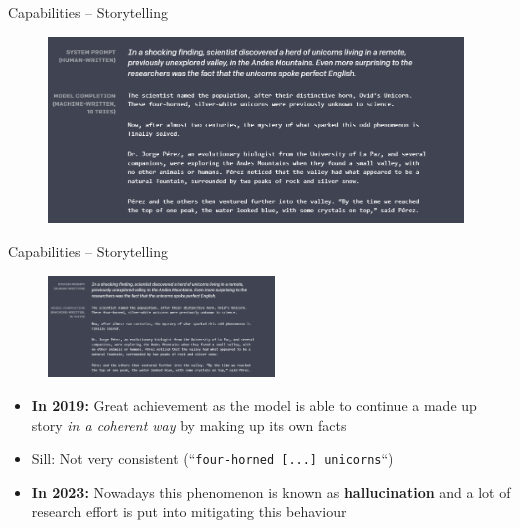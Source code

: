 \begin{frame}{Capabilities -- Storytelling}

\vfill

\begin{figure}
\centering
\includegraphics[width = 11cm]{figure/72-gpt2-story.png}\\ 
\end{figure}

\vfill

\end{frame}


\begin{frame}{Capabilities -- Storytelling}

\vfill

\begin{figure}
\centering
\includegraphics[width = 6cm]{figure/72-gpt2-story.png}\\ 
\end{figure}

\begin{itemize}
	\item \textbf{In 2019:} Great achievement as the model is able to continue a made up story \textit{in a coherent way} by making up its own facts
	\item[] Sill: Not very consistent (``\texttt{four-horned [...] unicorns}``)
	\item \textbf{In 2023:} Nowadays this phenomenon is known as \textbf{hallucination} and a lot of research effort is put into mitigating this behaviour
\end{itemize}

\vfill

\end{frame}

